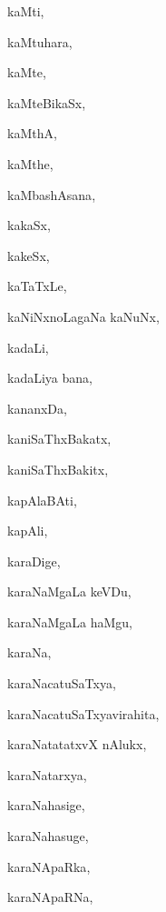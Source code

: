\begin{multicols}{3}
{\noindent
{kaMti}, \pageref{kaMti}

\noindent
{kaMtuhara}, \pageref{kaMtuhara}

\noindent
{kaMte}, \pageref{kaMte}

\noindent
{kaMteBikaSx}, \pageref{kaMteBikaSx}

\noindent
{kaMthA}, \pageref{kaMthA}

\noindent
{kaMthe}, \pageref{kaMthe}

\noindent
{kaMbashAsana}, \pageref{kaMbashAsana}

\noindent
{kakaSx}, \pageref{kakaSx}

\noindent
{kakeSx}, \pageref{kakeSx}

\noindent
{kaTaTxLe}, \pageref{kaTaTxLe}

\noindent
{kaNiNxnoLagaNa kaNuNx}, \pageref{kaNiNxnoLagaNa kaNuNx}

\noindent
{kadaLi}, \pageref{kadaLi}

\noindent
{kadaLiya bana}, \pageref{kadaLiya bana}

\noindent
{kananxDa}, \pageref{kananxDa}

\noindent
{kaniSaThxBakatx}, \pageref{kaniSaThxBakatx}

\noindent
{kaniSaThxBakitx}, \pageref{kaniSaThxBakitx}

\noindent
{kapAlaBAti}, \pageref{kapAlaBAti}

\noindent
{kapAli}, \pageref{kapAli}

\noindent
{karaDige}, \pageref{karaDige}

\noindent
{karaNaMgaLa keVDu}, \pageref{karaNaMgaLa keVDu}

\noindent
{karaNaMgaLa haMgu}, \pageref{karaNaMgaLa haMgu}

\noindent
{karaNa}, \pageref{karaNa}

\noindent
{karaNacatuSaTxya}, \pageref{karaNacatuSaTxya}

\noindent
{karaNacatuSaTxyavirahita}, \pageref{karaNacatuSaTxyavirahita}

\noindent
{karaNatatatxvX nAlukx}, \pageref{karaNatatatxvX nAlukx}

\noindent
{karaNatarxya}, \pageref{karaNatarxya}

\noindent
{karaNahasige}, \pageref{karaNahasige}

\noindent
{karaNahasuge}, \pageref{karaNahasuge}

\noindent
{karaNApaRka}, \pageref{karaNApaRka}

\noindent
{karaNApaRNa}, \pageref{karaNApaRNa}

}
\end{multicols}

